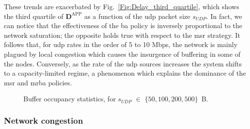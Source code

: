 These trends are exacerbated by Fig.~\ref{Fig:Delay_third_quartile}, which shows the third quartile of $\mathbf{D}^{\mathrm{APP}}$ as a function of the \gls{udp} packet size $s_{UDP}$. In fact, we can notice that the effectiveness of the \gls{ba} policy is inversely proportional to the network saturation; the opposite holds true with respect to the \gls{msr} strategy. It follows that, for \gls{udp} rates in the order of 5 to 10 Mbps, the network is mainly plagued by local congestion which causes the insurgence of buffering in some of the nodes. Conversely, as the rate of the \gls{udp} sources increases the system shifts to a capacity-limited regime, a phenomenon which explains the dominance of the \gls{msr} and \gls{mrba} policies.


\begin{figure}[tbp]
\centering
   \caption{Buffer occupancy statistics, for $s_{UDP}$ $\in$ $\{50, 100, 200, 500 \}$~B.}
  \label{Fig:BSR_median}
    \vspace{-.6cm} 
\end{figure}

\subsubsection{Network congestion}

